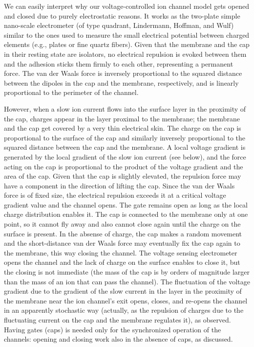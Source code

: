 We can easily interpret why our
voltage-controlled ion channel model gets opened and closed  due to purely electrostatic
reasons. It works as the two-plate simple
nano-scale electrometer (of type quadrant, Lindermann, Hoffman, and
Wulf) similar to the ones used to measure the small electrical potential
between charged elements (e.g., plates or fine quartz fibers).
Given that the membrane and the cap in their resting state are isolators,
no electrical repulsion is evoked between them and the adhesion sticks them firmly to each other, representing a permanent force. The van der Waals force is inversely
proportional to the squared distance between the dipoles in the cap and the membrane, respectively, and is linearly proportional to the perimeter of the channel.

However, when a slow ion current
flows into the surface layer in the proximity of the cap,
charges appear in the layer proximal to the membrane;
the membrane and the cap get covered by a very thin electrical skin.
The charge on the cap is proportional to the surface of the cap and similarly inversely proportional to the squared distance between the cap and the membrane. 
A local voltage gradient is generated by the local gradient of the slow ion current (see below), and the force acting on the cap is proportional to the
product of the voltage gradient and the area of the cap.
Given that the cap is slightly elevated, the repulsion
force may have a component in the direction of lifting the cap.
Since the van der Waals force is of fixed size, the electrical repulsion exceeds it at a critical voltage gradient value and the channel opens. 
The gate remains open as long as the local charge distribution enables it.
The cap is connected to the membrane only
at one point, so it cannot fly away and also cannot close again until the charge 
on the surface is present. 
In the absense of charge, the cap makes a random movement and the short-distance van der Waals force may eventually fix the cap again to the membrane, this way closing the channel.
The voltage sensing electrometer opens the channel and the lack of 
charge on the surface enables to close it, but the closing is not immediate
(the mass of the cap is by orders of magnitude larger than the mass of an ion that can pass the channel).
The fluctuation of the voltage gradient due to the gradient of the slow
current in the layer in the proximity of the membrane near the ion
channel's exit opens, closes, and re-opens the channel in an apparently
stochastic way (actually, as the repulsion of charges due to the fluctuating current on the cap and
the membrane regulates it), as observed.
Having gates (caps) is needed only for the synchronized operation of the channels: opening and closing work
also in the absence of caps, as discussed.

